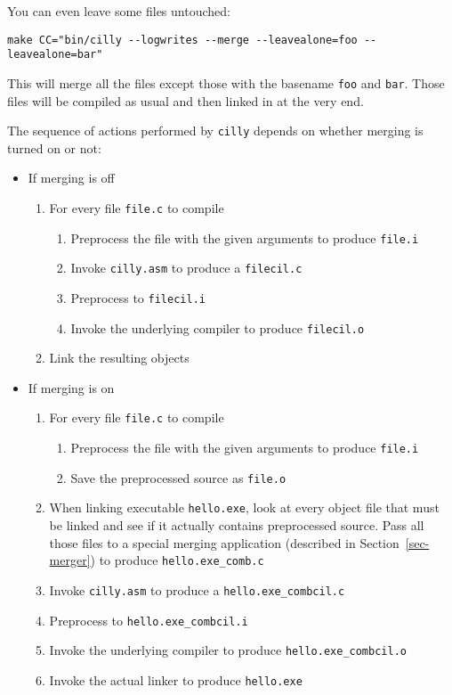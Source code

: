 \documentclass{article}
\def\secref#1{Section~\ref{sec-#1}}
\def\t#1{{\tt #1}}
\begin{document}
 You can even leave some files untouched:
\begin{verbatim}
make CC="bin/cilly --logwrites --merge --leavealone=foo --leavealone=bar"
\end{verbatim}

 This will merge all the files except those with the basename \t{foo} and
\t{bar}. Those files will be compiled as usual and then linked in at the very
end. 

 The sequence of actions performed by \t{cilly} depends on whether merging
is turned on or not:
\begin{itemize}
\item If merging is off
  \begin{enumerate}
    \item For every file \t{file.c} to compile
         \begin{enumerate}
            \item Preprocess the file with the given arguments to 
                  produce \t{file.i}
            \item Invoke \t{cilly.asm} to produce a \t{filecil.c}
            \item Preprocess to \t{filecil.i}
            \item Invoke the underlying compiler to produce \t{filecil.o}
         \end{enumerate}
    \item Link the resulting objects
  \end{enumerate}
\item If merging is on
  \begin{enumerate}
    \item For every file \t{file.c} to compile
         \begin{enumerate}
            \item Preprocess the file with the given arguments to 
                  produce \t{file.i}
            \item Save the preprocessed source as \t{file.o}
         \end{enumerate}
    \item When linking executable \t{hello.exe}, look at every object 
          file that must be linked and see if it actually 
          contains preprocessed source. Pass all those files to a 
          special merging application (described in
          \secref{merger}) to produce \t{hello.exe\_comb.c}
    \item Invoke \t{cilly.asm} to produce a \t{hello.exe\_combcil.c}
    \item Preprocess to \t{hello.exe\_combcil.i}
    \item Invoke the underlying compiler to produce \t{hello.exe\_combcil.o}
    \item Invoke the actual linker to produce \t{hello.exe}
  \end{enumerate}
\end{itemize}
\end{document}
